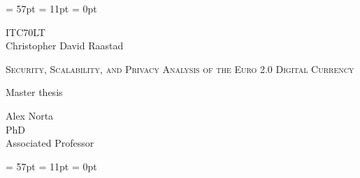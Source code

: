 \documentclass[12pt]{article} %
\begin{document}

\thispagestyle{fancy} %
\renewcommand{\headrulewidth}{0pt} %
\renewcommand{\footrulewidth}{0pt} %
\headheight = 57pt %
\footskip = 11pt %
\headsep = 0pt %

\vspace*{7 cm} %

\begin{center} %
ITC70LT\\[0cm]
Christopher David Raastad\\
\begin{LARGE}
\textsc{Security, Scalability, and Privacy Analysis of the Euro 2.0 Digital Currency\\}
\end{LARGE}
Master thesis\\[2cm]
\end{center}

\begin{flushright} %
Alex Norta\\[0cm]
PhD\\[0cm]
Associated Professor\\[0cm]
\end{flushright}

\pagebreak %

\thispagestyle{fancy} %
\renewcommand{\headrulewidth}{0pt} %
\renewcommand{\footrulewidth}{0pt} %
\headheight = 57pt %
\footskip = 11pt %
\headsep = 0pt %
\end{document}
